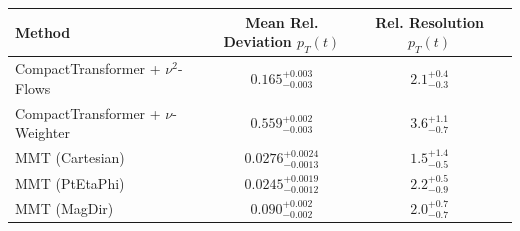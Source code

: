     \begin{tabular}{lccc}
        \toprule
        Method & Mean Rel. Deviation $p_{T}(t)$ & Rel. Resolution $p_{T}(t)$ \\
        \midrule
        CompactTransformer + $\nu^2$-Flows & $0.165^{+0.003}_{-0.003}$ & $2.1^{+0.4}_{-0.3}$ \\
        CompactTransformer + $\nu$-Weighter & $0.559^{+0.002}_{-0.003}$ & $3.6^{+1.1}_{-0.7}$ \\
        MMT (Cartesian) & $0.0276^{+0.0024}_{-0.0013}$ & $1.5^{+1.4}_{-0.5}$ \\
        MMT (PtEtaPhi) & $0.0245^{+0.0019}_{-0.0012}$ & $2.2^{+0.5}_{-0.9}$ \\
        MMT (MagDir) & $0.090^{+0.002}_{-0.002}$ & $2.0^{+0.7}_{-0.7}$ \\
        \bottomrule
    \end{tabular}
